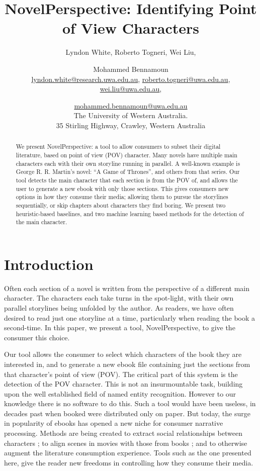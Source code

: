 \documentclass[11pt,a4paper]{article}
\title{NovelPerspective: Identifying Point of View Characters}
\author{Lyndon White, %
	Roberto Togneri, %
	Wei Liu, %
	\and Mohammed Bennamoun%
	\\ 
	\url{lyndon.white@research.uwa.edu.au}, %
	\url{roberto.togneri@uwa.edu.au},\\
	\url{wei.liu@uwa.edu.au}, %
	\and \url{mohammed.bennamoun@uwa.edu.au}%
	\\
	The University of Western Australia.\\
	35 Stirling Highway, Crawley, Western Australia
}
\newcommand{\parencite}{\citep}
\begin{document}
\maketitle

\begin{abstract}
We present NovelPerspective: a tool to allow consumers to subset their digital literature, based on point of view (POV) character.
Many novels have multiple main characters each with their own storyline running in parallel.
A well-known example is George R. R. Martin's  novel: ``A Game of Thrones'', and others from that series.
Our tool detects the main character that each section is from the POV of,
and allows the user to generate a new ebook with only those sections.
This gives consumers new options in how they consume their media; allowing them to  pursue the storylines sequentially, or skip chapters about characters they find boring.
We present two heuristic-based baselines, and two machine learning based methods for the detection of the main character.
\end{abstract}

\section{Introduction}
Often each section of a novel is written  from the perspective of a different main character.
The characters each take turns in the spot-light,
with their own parallel storylines being unfolded by the author.
As readers, we have often desired to read just one storyline at a time, particularly when reading the book a second-time.
In this paper, we present a tool, NovelPerspective, to give the consumer this choice.

Our tool allows the consumer to select which characters of the book they are interested in,
and to generate a new ebook file containing just the sections from that character's point of view (POV).
The critical part of this system is the detection of the POV character.
This is not an insurmountable task, building upon the well established field of named entity recognition.
However to our knowledge there is no software to do this.
Such a tool would have been useless, in decades past when booked were distributed only on paper.
But today, the surge in popularity of ebooks has opened a new niche for consumer narrative processing.
Methods are being created to extract social relationships between characters \parencite{elson2010socialnetworks,wohlgenannt2016extracting};
to align scenes in movies with those from books \parencite{moviebook}; and to otherwise augment the literature consumption experience.
Tools such as the one presented here, give the reader new freedoms in controlling how they consume their media.
\end{document}
